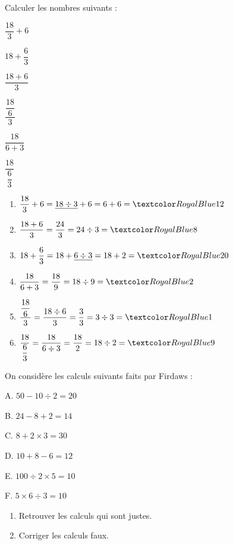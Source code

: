 \begin{Maquette}[Fiche,CorrigeFin,Colonnes=2]{}
\begin{multicols}{2}
      \begin{exercice} %
         Calculer les nombres suivants :
         \begin{colenumerate}[3]
            \item $\dfrac{18}{3}+6$
            \item $18+\dfrac{6}{3}$
            \item $\dfrac{18+6}{3}$
            \item $\dfrac{\dfrac{18}{6}}{3}$
            \item $\dfrac{18}{6+3}$
            \item $\dfrac{18}{\dfrac{6}{3}}$
         \end{colenumerate}
      \end{exercice}

      \begin{Solution}
         \begin{enumerate}
            \item $\dfrac{18}{3}+6 =\underline{18\div3}+6 =6+6 =\cor{12}$ \smallskip
            \item $\dfrac{18+6}{3} =\dfrac{24}{3} =24\div3 =\cor{8}$ \smallskip
            \item $18+\dfrac{6}{3} =18+\underline{6\div3} =18+2 =\cor{20}$ \smallskip
            \item $\dfrac{18}{6+3} =\dfrac{18}{9} =18\div9 =\cor{2}$ \smallskip
            \item $\dfrac{\dfrac{18}{6}}{3} =\dfrac{18\div6}{3} =\dfrac{3}{3} =3\div3 =\cor{1}$ \smallskip
            \item $\dfrac{18}{\dfrac{6}{3}} =\dfrac{18}{6\div3} =\dfrac{18}{2} =18\div2 =\cor{9}$
         \end{enumerate}
      \end{Solution}
      

      \begin{exercice} %
         On considère les calculs suivants faits par Firdaws : \par
         \begin{multicols}{2}
            A. \quad $50-10\div2 =20$ \par
            B. \quad $24-8+2 =14$ \par
            C. \quad $8+2\times3 =30$ \par
            D. \quad $10+8-6 =12$ \par
            E. \quad $100\div2\times5 =10$ \par
            F. \quad $5\times6\div3 =10$
         \end{multicols}
         \begin{enumerate}
            \item Retrouver les calculs qui sont justes.
            \item Corriger les calculs faux.
         \end{enumerate}
      \end{exercice}


\end{multicols}
\end{Maquette}
